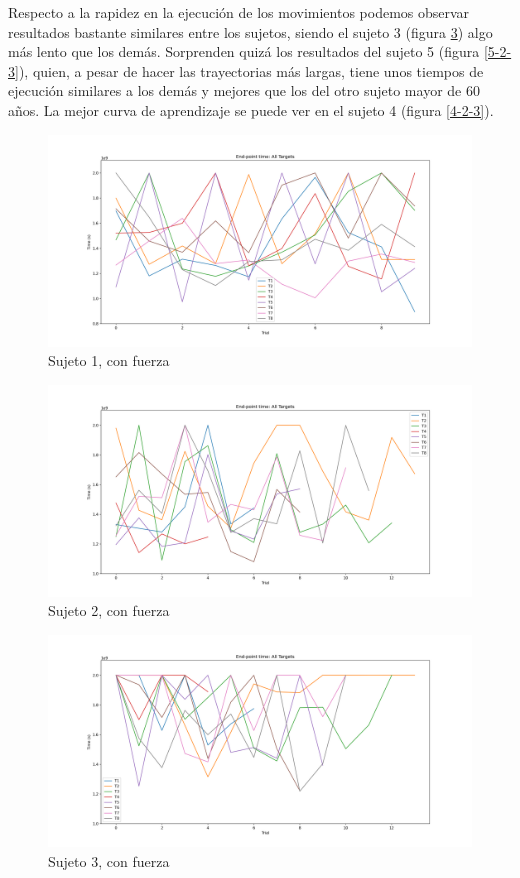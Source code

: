 \documentclass[a4paper,11pt, oneside]{book}
\begin{document}
Respecto a la rapidez en la ejecución de los movimientos podemos observar resultados bastante similares entre los sujetos, siendo el sujeto 3 (figura \ref{3-2-3}) algo más lento que los demás. Sorprenden quizá los resultados del sujeto 5 (figura \ref{5-2-3}), quien, a pesar de hacer las trayectorias más largas, tiene unos tiempos de ejecución similares a los demás y mejores que los del otro sujeto mayor de 60 años. La mejor curva de aprendizaje se puede ver en el sujeto 4 (figura \ref{4-2-3}).

\begin{figure}[H]
	\includegraphics[width=\linewidth]{sujeto1/force/evolution_time}
	\caption{Sujeto 1, con fuerza}
	\label{1-2-3}
\end{figure}
\begin{figure}[H]
	\includegraphics[width=\linewidth]{sujeto2/force/evolution_time}
	\caption{Sujeto 2, con fuerza}
	\label{2-2-3}
\end{figure}
\begin{figure}[H]
	\includegraphics[width=\linewidth]{sujeto3/force/evolution_time}
	\caption{Sujeto 3, con fuerza}
	\label{3-2-3}
\end{figure}
\end{document}
